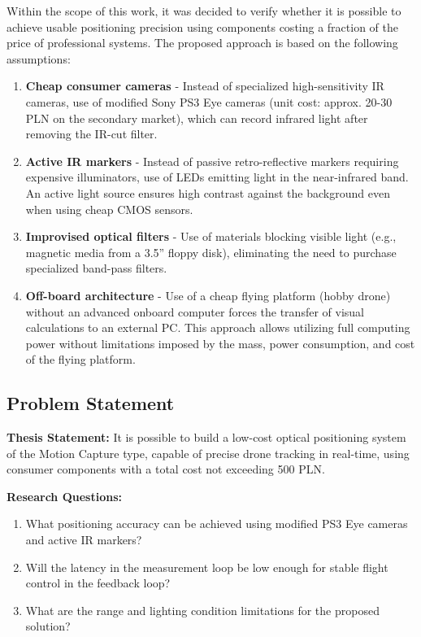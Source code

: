 \documentclass{EE-dyplom}
\begin{document}
Within the scope of this work, it was decided to verify whether it is possible to achieve usable positioning precision using components costing a fraction of the price of professional systems. The proposed approach is based on the following assumptions:

\begin{enumerate}
    \item \textbf{Cheap consumer cameras} - Instead of specialized high-sensitivity IR cameras, use of modified Sony PS3 Eye cameras (unit cost: approx. 20-30 PLN on the secondary market), which can record infrared light after removing the IR-cut filter.
    
    \item \textbf{Active IR markers} - Instead of passive retro-reflective markers requiring expensive illuminators, use of LEDs emitting light in the near-infrared band. An active light source ensures high contrast against the background even when using cheap CMOS sensors.
    
    \item \textbf{Improvised optical filters} - Use of materials blocking visible light (e.g., magnetic media from a 3.5'' floppy disk), eliminating the need to purchase specialized band-pass filters.
    
    \item \textbf{Off-board architecture} - Use of a cheap flying platform (hobby drone) without an advanced onboard computer forces the transfer of visual calculations to an external PC. This approach allows utilizing full computing power without limitations imposed by the mass, power consumption, and cost of the flying platform.
\end{enumerate}

\subsection{Problem Statement}

\textbf{Thesis Statement:} It is possible to build a low-cost optical positioning system of the Motion Capture type, capable of precise drone tracking in real-time, using consumer components with a total cost not exceeding 500 PLN.

\textbf{Research Questions:}
\begin{enumerate}
    \item What positioning accuracy can be achieved using modified PS3 Eye cameras and active IR markers?
    \item Will the latency in the measurement loop be low enough for stable flight control in the feedback loop?
    \item What are the range and lighting condition limitations for the proposed solution?
\end{enumerate}
\end{document}
